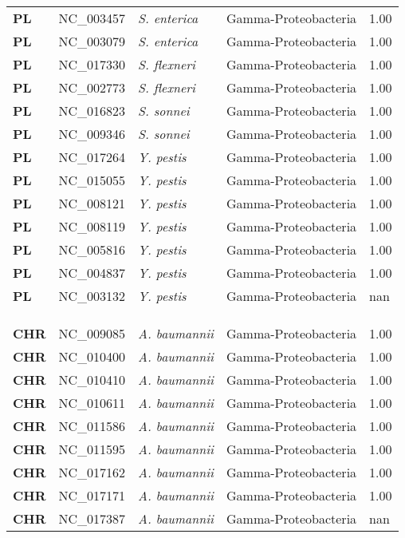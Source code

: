 \begin{adjustwidth}{-3cm}{2cm}
{\begin{supertabular}{>{\bfseries}l|p{0.1\textwidth}p{0.14\textwidth}l|l}
PL & NC\_003457 & \textit{S. enterica} & Gamma-Proteobacteria & 1.00\\
PL & NC\_003079 & \textit{S. enterica} & Gamma-Proteobacteria & 1.00\\
PL & NC\_017330 & \textit{S. flexneri} & Gamma-Proteobacteria & 1.00\\
PL & NC\_002773 & \textit{S. flexneri} & Gamma-Proteobacteria & 1.00\\
PL & NC\_016823 & \textit{S. sonnei} & Gamma-Proteobacteria & 1.00\\
PL & NC\_009346 & \textit{S. sonnei} & Gamma-Proteobacteria & 1.00\\
PL & NC\_017264 & \textit{Y. pestis} & Gamma-Proteobacteria & 1.00\\
PL & NC\_015055 & \textit{Y. pestis} & Gamma-Proteobacteria & 1.00\\
PL & NC\_008121 & \textit{Y. pestis} & Gamma-Proteobacteria & 1.00\\
PL & NC\_008119 & \textit{Y. pestis} & Gamma-Proteobacteria & 1.00\\
PL & NC\_005816 & \textit{Y. pestis} & Gamma-Proteobacteria & 1.00\\
PL & NC\_004837 & \textit{Y. pestis} & Gamma-Proteobacteria & 1.00\\
PL & NC\_003132 & \textit{Y. pestis} & Gamma-Proteobacteria & nan\\
\\
\\
\hline\\
CHR & NC\_009085 & \textit{A. baumannii} & Gamma-Proteobacteria & 1.00\\
CHR & NC\_010400 & \textit{A. baumannii} & Gamma-Proteobacteria & 1.00\\
CHR & NC\_010410 & \textit{A. baumannii }& Gamma-Proteobacteria & 1.00\\
CHR & NC\_010611 & \textit{A. baumannii} & Gamma-Proteobacteria & 1.00\\
CHR & NC\_011586 & \textit{A. baumannii} & Gamma-Proteobacteria & 1.00\\
CHR & NC\_011595 & \textit{A. baumannii} & Gamma-Proteobacteria & 1.00\\
CHR & NC\_017162 & \textit{A. baumannii} & Gamma-Proteobacteria & 1.00\\
CHR & NC\_017171 & \textit{A. baumannii} & Gamma-Proteobacteria & 1.00\\
CHR & NC\_017387 & \textit{A. baumannii} & Gamma-Proteobacteria & nan\\

\end{supertabular}}
\end{adjustwidth}
